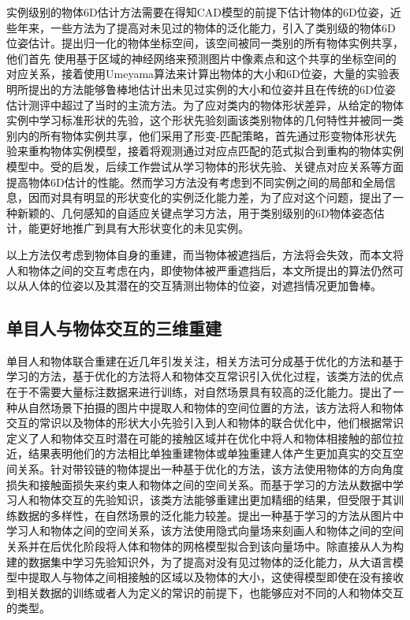 实例级别的物体6D估计方法需要在得知CAD模型的前提下估计物体的6D位姿，近些年来，一些方法为了提高对未见过的物体的泛化能力，引入了类别级的物体6D位姿估计。\citet{Wang_2019_CVPR}提出归一化的物体坐标空间，该空间被同一类别的所有物体实例共享，他们首先
使用基于区域的神经网络来预测图片中像素点和这个共享的坐标空间的对应关系，接着使用Umeyama算法来计算出物体的大小和6D位姿，大量的实验表明所提出的方法能够鲁棒地估计出未见过实例的大小和位姿并且在传统的6D位姿估计测评中超过了当时的主流方法。为了应对类内的物体形状差异，\citet{Tian_2020_ECCV}从给定的物体实例中学习标准形状的先验，这个形状先验刻画该类别物体的几何特性并被同一类别内的所有物体实例共享，他们采用了形变-匹配策略，首先通过形变物体形状先验来重构物体实例模型，接着将观测通过对应点匹配的范式拟合到重构的物体实例模型中。受\citet{Tian_2020_ECCV}的启发，后续工作\citep{chen2021sgpa, Lin_2021_ICCV, Wang2021CategoryLevel6O, RBPPOSE}尝试从学习物体的形状先验、关键点对应关系等方面提高物体6D估计的性能。然而学习方法没有考虑到不同实例之间的局部和全局信息，因而对具有明显的形状变化的实例泛化能力差，为了应对这个问题，\citet{Lin2024InstanceAdaptiveAG}提出了一种新颖的、几何感知的自适应关键点学习方法，用于类别级别的6D物体姿态估计，能更好地推广到具有大形状变化的未见实例。

以上方法仅考虑到物体自身的重建，而当物体被遮挡后，方法将会失效，而本文将人和物体之间的交互考虑在内，即使物体被严重遮挡后，本文所提出的算法仍然可以从人体的位姿以及其潜在的交互猜测出物体的位姿，对遮挡情况更加鲁棒。

\subsection{单目人与物体交互的三维重建}

单目人和物体联合重建在近几年引发关注，相关方法可分成基于优化的方法和基于学习的方法，基于优化的方法将人和物体交互常识引入优化过程，该类方法的优点在于不需要大量标注数据来进行训练，对自然场景具有较高的泛化能力。\citet{zhang2020phosa}提出了一种从自然场景下拍摄的图片中提取人和物体的空间位置的方法，该方法将人和物体交互的常识以及物体的形状大小先验引入到人和物体的联合优化中，他们根据常识定义了人和物体交互时潜在可能的接触区域并在优化中将人和物体相接触的部位拉近，结果表明他们的方法相比单独重建物体或单独重建人体产生更加真实的交互空间关系。\citet{xu2021d3dhoi}针对带铰链的物体提出一种基于优化的方法，该方法使用物体的方向角度损失和接触面损失来约束人和物体之间的空间关系。而基于学习的方法从数据中学习人和物体交互的先验知识，该类方法能够重建出更加精细的结果，但受限于其训练数据的多样性，在自然场景的泛化能力较差。\citet{xie2022chore}提出一种基于学习的方法从图片中学习人和物体之间的空间关系，该方法使用隐式向量场来刻画人和物体之间的空间关系并在后优化阶段将人体和物体的网格模型拟合到该向量场中。除直接从人为构建的数据集中学习先验知识外，为了提高对没有见过物体的泛化能力，\citet{wang2022reconstruction}从大语言模型中提取人与物体之间相接触的区域以及物体的大小，这使得模型即使在没有接收到相关数据的训练或者人为定义的常识的前提下，也能够应对不同的人和物体交互的类型。

